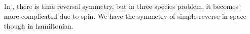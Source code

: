 \subsection{}
In \cite{AndersonBCS}, there is time reversal symmetry, but in three species problem, it becomes more complicated due to spin.  We have the symmetry of simple reverse in space though in hamiltonian.  